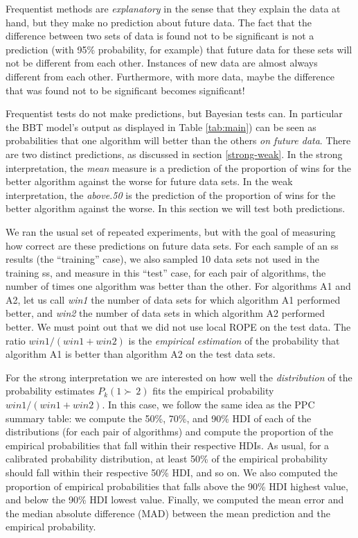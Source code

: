 \documentclass[twoside,11pt,preprint]{article}
\begin{document}
Frequentist methods are \emph{explanatory} in the sense that they explain
the data at hand, but they make no prediction about future data. The fact
that the difference between two sets of data is found not to be
significant is not a prediction (with 95\% probability, for example)
that future data for these sets will not be different from each
other. Instances of new data are almost always different from each other. Furthermore,
with more data, maybe the difference that was found not to be
significant becomes significant!

Frequentist tests do not make predictions, but Bayesian tests can. In
particular the BBT model's output as displayed in Table
\ref{tab:main}) can be seen as probabilities that one algorithm will better than
the others \emph{on future data}. There are two distinct predictions, as
discussed in section \ref{strong-weak}. In the strong interpretation,
the {\em mean} measure is a prediction of the proportion of wins for the
better algorithm against the worse for future data
sets. In the weak interpretation, the {\em above.50} is the prediction of
the proportion of wins for the better algorithm against the worse. In
this section we will test both predictions.

We ran the usual set of repeated experiments, but with the goal of
measuring how correct are these predictions on future data sets. For each sample of an
ss results (the ``training'' case), we also sampled 10 data sets not
used in the training ss, and measure in this ``test'' case, for each
pair of algorithms, the number of times one algorithm was better than
the other. For algorithms A1 and A2, let us call \emph{win1} the number of data sets for which
algorithm A1 performed better, and \emph{win2} the number of data sets in
which algorithm A2 performed better. We must point out that we did not
use local ROPE on the test data. The ratio \(win1/(win1+win2)\) is the
\emph{empirical estimation} of the probability that algorithm A1 is better
than algorithm A2 on the test data sets.

For the strong interpretation we are interested on how well the
\emph{distribution} of the probability estimates \(P_k(1 \succ\,2)\) fits
the empirical probability \(win1/(win1+win2)\). In this case, we follow
the same idea as the PPC summary table: we compute the 50\%, 70\%, and 90\%
HDI of each of the distributions (for each pair of algorithms) and
compute the proportion of the empirical probabilities that fall within
their respective HDIs. As usual, for a calibrated probability
distribution, at least 50\% of the empirical probability should fall
within their respective 50\% HDI, and so on. We also computed the
proportion of empirical probabilities that falls above the 90\% HDI
highest value, and below the 90\% HDI lowest value. Finally, we
computed the mean error and the median absolute difference (MAD) between the mean
prediction and the empirical probability.
\end{document}
